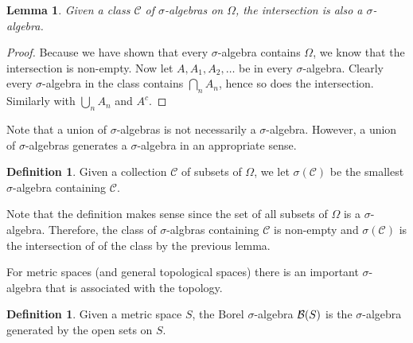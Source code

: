 \documentclass{amsart}
\newtheorem{lem}[thm]{Lemma}
\theoremstyle{remark}
\theoremstyle{definition}
\newtheorem{defn}[thm]{Definition}
\begin{document}
\begin{lem}Given a class $\mathcal{C}$ of $\sigma$-algebras on
  $\Omega$, the intersection is also a $\sigma$-algebra.
\end{lem}
\begin{proof}
Because we have shown that every $\sigma$-algebra contains $\Omega$,
we know that the intersection is non-empty.  Now let $A, A_1, A_2, \dots$
be in every $\sigma$-algebra.  Clearly every $\sigma$-algebra in the
class contains $\bigcap_n A_n$, hence so does the intersection.
Similarly with $\bigcup_n A_n$ and $A^c$.
\end{proof}
Note that a union of $\sigma$-algebras is not necessarily a
$\sigma$-algebra.  However, a union of $\sigma$-algebras generates a
$\sigma$-algebra in an appropriate sense.
\begin{defn}Given a collection $\mathcal{C}$ of subsets of $\Omega$,
  we let $\sigma(\mathcal{C})$ be the smallest $\sigma$-algebra
  containing $\mathcal{C}$.
\end{defn}
Note that the definition makes sense since the set of all subsets of
$\Omega$ is a $\sigma$-algebra.  Therefore, the class of
$\sigma$-algbras containing $\mathcal{C}$ is non-empty and
$\sigma(\mathcal{C})$ is the intersection of of the class by the
previous lemma.

For metric spaces (and general topological spaces) there is an
important $\sigma$-algebra that is associated with the topology.
\begin{defn}Given a metric space $S$, the Borel $\sigma$-algebra
  $\mathcal{B}(S)$ is the $\sigma$-algebra generated by the open sets on $S$.
\end{defn}
\end{document}

